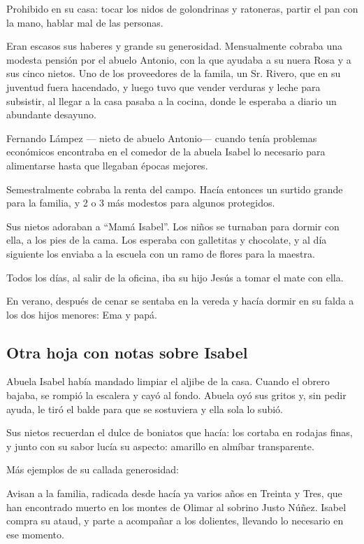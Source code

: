 \documentclass[a4paper]{article}
\begin{document}
Prohibido en su casa: tocar los nidos de golondrinas y ratoneras, partir el pan con la mano, hablar mal de las personas.

Eran escasos sus haberes y grande su generosidad. Mensualmente cobraba una modesta pensión por el abuelo Antonio, con la que ayudaba a su nuera Rosa y a sus cinco nietos. Uno de los proveedores de la famila, un Sr. Rivero, que en su juventud fuera hacendado, y luego tuvo que vender verduras y leche para subsistir, al llegar a la casa pasaba a la cocina, donde le esperaba a diario un abundante desayuno.

Fernando Lámpez --- nieto de abuelo Antonio--- cuando tenía problemas e\-co\-nó\-mi\-cos encontraba en el comedor de la abuela Isabel lo necesario para alimentarse hasta que llegaban épocas mejores.

Semestralmente cobraba la renta del campo. Hacía entonces un surtido grande para la familia, y 2 o 3 más modestos para algunos protegidos.

Sus nietos adoraban a ``Mamá Isabel''. Los niños se turnaban para dormir con ella, a los pies de la cama. Los esperaba con galletitas y chocolate, y al día siguiente los enviaba a la escuela con un ramo de flores para la maestra.

Todos los días, al salir de la oficina, iba su hijo Jesús a tomar el mate con ella.

En verano, después de cenar se sentaba en la vereda y hacía dormir en su falda a los dos hijos menores: Ema y papá.

\subsection{Otra hoja con notas sobre Isabel}

Abuela Isabel había mandado limpiar el aljibe de la casa. Cuando el obrero bajaba, se rompió la escalera y cayó al fondo. Abuela oyó sus gritos y, sin pedir ayuda, le tiró el balde para que se sostuviera y ella sola lo subió.

\bigbreak{}

Sus nietos recuerdan el dulce de boniatos que hacía: los cortaba en rodajas finas, y junto con su sabor lucía su aspecto: amarillo en almíbar transparente.

\bigbreak{}

Más ejemplos de su callada generosidad:

Avisan a la familia, radicada desde hacía ya varios años en Treinta y Tres, que han encontrado muerto en los montes de Olimar al sobrino Justo Núñez. Isabel compra su ataud, y parte a acompañar a los dolientes, llevando lo necesario en ese momento.
\end{document}
